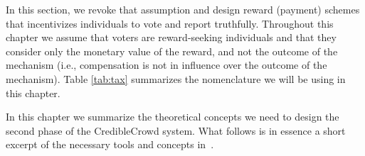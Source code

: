 \documentclass{report}
\theoremstyle{definition}
\newcommand{\nitem}[1][]{\item \textbf{#1:}}
\begin{document}
In this section, we revoke that assumption and design reward (payment) schemes that incentivizes individuals to vote and report truthfully. Throughout this chapter we assume that voters are reward-seeking individuals and that they consider only the monetary value of the reward, and not the outcome of the mechanism (i.e., compensation is not in influence over the outcome of the mechanism). Table \ref{tab:tax} summarizes the nomenclature we will be using in this chapter.

In this chapter we summarize the theoretical concepts we need to design the second phase of the CredibleCrowd system. What follows is in essence a short excerpt of the necessary tools and concepts in~\cite{faltings:book}.


 
 
 
\end{document}
